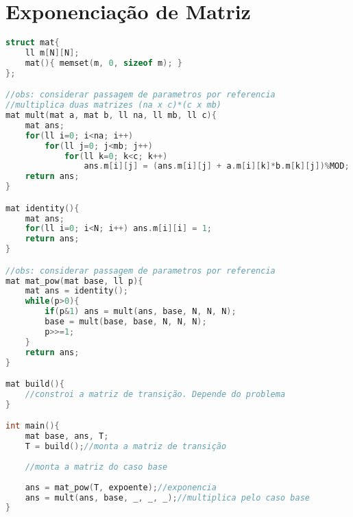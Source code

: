 \documentclass[12pt,a4paper,twoside]{report}
\begin{document}
\section{Exponenciação de Matriz}
\noindent\begin{lstlisting}[caption=Exponenciação de Matriz,language=C++]
struct mat{
    ll m[N][N];
    mat(){ memset(m, 0, sizeof m); }
};

//obs: considerar passagem de parametros por referencia
//multiplica duas matrizes (na x c)*(c x mb)
mat mult(mat a, mat b, ll na, ll mb, ll c){  
    mat ans;    
    for(ll i=0; i<na; i++)
        for(ll j=0; j<mb; j++)
            for(ll k=0; k<c; k++)
                ans.m[i][j] = (ans.m[i][j] + a.m[i][k]*b.m[k][j])%MOD;
    return ans;
}

mat identity(){
    mat ans;
    for(ll i=0; i<N; i++) ans.m[i][i] = 1;
    return ans;
}

//obs: considerar passagem de parametros por referencia
mat mat_pow(mat base, ll p){ 
    mat ans = identity();
    while(p>0){
        if(p&1) ans = mult(ans, base, N, N, N);
        base = mult(base, base, N, N, N);
        p>>=1;
    }
    return ans;
}

mat build(){
    //constroi a matriz de transição. Depende do problema
}

int main(){ 
    mat base, ans, T;
    T = build();//monta a matriz de transição
    
    //monta a matriz do caso base
    
    ans = mat_pow(T, expoente);//exponencia
    ans = mult(ans, base, _, _, _);//multiplica pelo caso base
}
\end{lstlisting}
\end{document}
